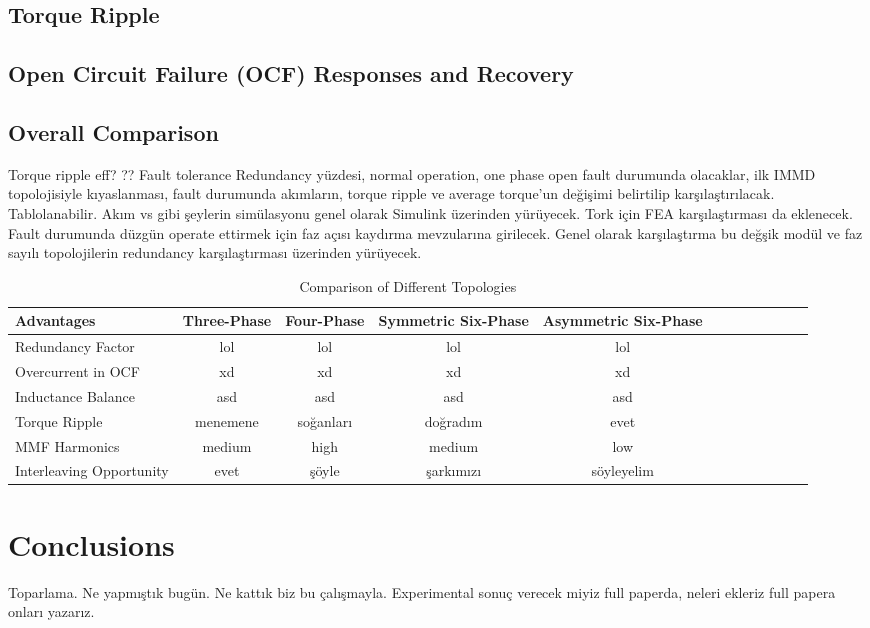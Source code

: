 \documentclass[a4paper,11pt]{article}
\begin{document}
\subsection{\normalsize\textbf{Torque Ripple}}

\subsection{\normalsize\textbf{Open Circuit Failure (OCF) Responses and Recovery}}

\subsection{\normalsize\textbf{Overall Comparison}}
Torque ripple
eff?
??
Fault tolerance
Redundancy yüzdesi, normal operation, one phase open fault durumunda olacaklar, ilk IMMD topolojisiyle kıyaslanması, fault durumunda akımların, torque ripple ve average torque'un değişimi belirtilip karşılaştırılacak. Tablolanabilir. Akım vs gibi şeylerin simülasyonu genel olarak Simulink üzerinden yürüyecek. Tork için FEA karşılaştırması da eklenecek. Fault durumunda düzgün operate ettirmek için faz açısı kaydırma mevzularına girilecek. Genel olarak karşılaştırma bu değşik modül ve faz sayılı topolojilerin redundancy karşılaştırması üzerinden yürüyecek. 

\begin{table}[ht!]
 \caption{Comparison of Different Topologies}
\label{kd}
\begin{tabularx}{\textwidth}{@{}l*{10}{C}c@{}}
\toprule
Advantages      & Three-Phase  & Four-Phase & Symmetric Six-Phase & Asymmetric Six-Phase \\ 
\midrule
Redundancy Factor    & lol    & lol    & lol   & lol \\ 
Overcurrent in OCF   & xd      & xd  & xd    & xd \\ 
Inductance Balance  &  asd &   asd&    asd&  asd\\
Torque Ripple  & menemene  & soğanları   & doğradım   & evet  \\
MMF Harmonics  & medium    & high  & medium  & low  \\ 
Interleaving Opportunity  & evet  & şöyle   & şarkımızı   & söyleyelim  \\


\bottomrule
\end{tabularx}
\end{table}
\section{\normalsize\textbf{Conclusions}}
Toparlama. Ne yapmıştık bugün. Ne kattık biz bu çalışmayla. Experimental sonuç verecek miyiz full paperda, neleri ekleriz full papera onları yazarız.

\AtNextBibliography{\tiny}
\printbibliography
\end{document}
